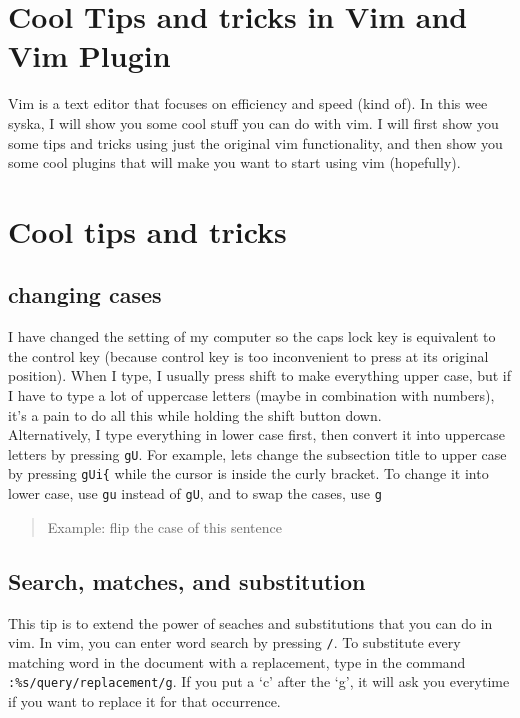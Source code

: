 \documentclass[a4paper, 12pt]{article}
\begin{document}
\section{Cool Tips and tricks in Vim and Vim Plugin}

Vim is a text editor that focuses on efficiency and speed (kind of).
In this wee syska, I will show you some cool stuff you can do with vim.
I will first show you some tips and tricks using just the original vim functionality, and then show you some cool plugins that will make you want to start using vim (hopefully).

\section{Cool tips and tricks}

\subsection{changing cases}

I have changed the setting of my computer so the caps lock key is equivalent to the control key (because control key is too inconvenient to press at its original position).
When I type, I usually press shift to make everything upper case, but if I have to type a lot of uppercase letters (maybe in combination with numbers), it's a pain to do all this while holding the shift button down.\\

Alternatively, I type everything in lower case first, then convert it into uppercase letters by pressing \texttt{gU}.
For example, lets change the subsection title to upper case by pressing \texttt{gUi\{} while the cursor is inside the curly bracket.
To change it into lower case, use \texttt{gu} instead of \texttt{gU}, and to swap the cases, use \texttt{g~}
\begin{quote}




Example: flip the case of this sentence




\end{quote}

\subsection{Search, matches, and substitution}

This tip is to extend the power of seaches and substitutions that you can do in vim.
In vim, you can enter word search by pressing \texttt{/}.
To substitute every matching word in the document with a replacement, type  in the command \texttt{:\%s/query/replacement/g}.
If you put a `c' after the `g', it will ask you everytime if you want to replace it for that occurrence.
\end{document}
